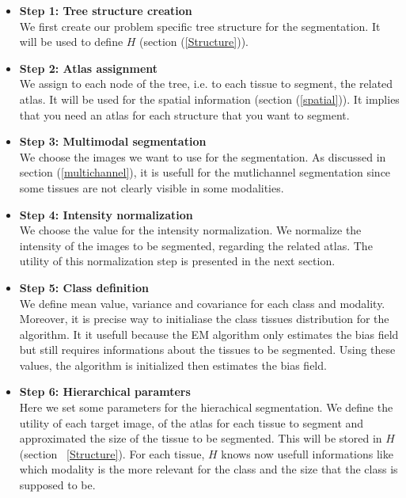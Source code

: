 \begin{itemize}
\item \textbf{Step 1: Tree structure creation}\\
\hspace*{4 mm}We first create our problem specific tree structure for the segmentation. It will be used to define $H$ (section (\ref{Structure})).
%
\item \textbf{Step 2: Atlas assignment}\\
\hspace*{4 mm}We assign to each node of the tree, i.e. to each tissue to segment, the related atlas. It will be used for the spatial information (section (\ref{spatial})). It implies that you need an atlas for each structure that you want to segment.
%
\item \textbf{Step 3: Multimodal segmentation}\\
\hspace*{4 mm}We choose the images we want to use for the segmentation. As discussed in section (\ref{multichannel}), it is usefull for the mutlichannel segmentation since some tissues are not clearly visible in some modalities.
%
\item \textbf{Step 4: Intensity normalization}\\
\hspace*{4 mm}We choose the value for the intensity normalization. We normalize the intensity of the images to be segmented, regarding the related atlas. The utility of this normalization step is presented in the next section.
%
\item \textbf{Step 5: Class definition}\\
\hspace*{4 mm}We define mean value, variance and covariance for each class and modality. Moreover, it is precise way to initialiase the class tissues distribution for the algorithm. It it usefull because the EM algorithm only estimates the bias field but still requires informations about the tissues to be segmented. Using these values, the algorithm is initialized then estimates the bias field.
%
\item \textbf{Step 6: Hierarchical paramters}\\
\hspace*{4 mm}Here we set some parameters for the hierachical segmentation. We define the utility of each target image, of the atlas for each tissue to segment and approximated the size of the tissue to be segmented. This will be stored in $H$ (section ~\ref{Structure}). For each tissue, $H$ knows now usefull informations like which modality is the more relevant  for the class and the size that the class is supposed to be.

\end{itemize}
